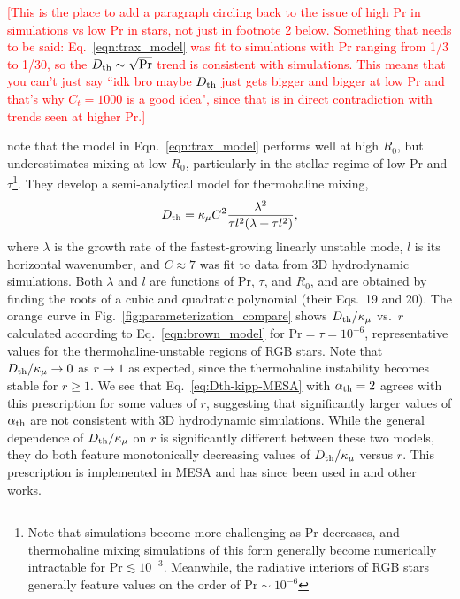 \textcolor{red}{[This is the place to add a paragraph circling back to the issue of high Pr in simulations vs low Pr in stars, not just in footnote 2 below. Something that needs to be said: Eq.~\eqref{eqn:trax_model} was fit to simulations with Pr ranging from 1/3 to 1/30, so the $D_\mathrm{th} \sim \sqrt{\mathrm{Pr}}$ trend is consistent with simulations. This means that you can't just say ``idk bro maybe $D_\mathrm{th}$ just gets bigger and bigger at low Pr and that's why $C_t = 1000$ is a good idea", since that is in direct contradiction with trends seen at higher Pr.]}

\citet{brown_etal_2013} note that the model in Eqn.~\eqref{eqn:trax_model} performs well at high $R_0$, but underestimates mixing at low $R_0$, particularly in the stellar regime of low Pr and $\tau$\footnote{Note that simulations become more challenging as $\mathrm{Pr}$ decreases, and thermohaline mixing simulations of this form generally become numerically intractable for $\mathrm{Pr} \lesssim 10^{-3}$. Meanwhile, the radiative interiors of RGB stars generally feature values on the order of $\mathrm{Pr} \sim 10^{-6}$}.
They develop a semi-analytical model for thermohaline mixing,
\begin{equation}
    \Dth = \kappa_{\mu}C^2\frac{\lambda^2}{\tau l^2(\lambda + \tau l^2)},
    \label{eqn:brown_model}
\end{equation}
where $\lambda$ is the growth rate of the fastest-growing linearly unstable mode, $l$ is its horizontal wavenumber, and $C \approx 7$ was fit to data from 3D hydrodynamic simulations.
Both $\lambda$ and $l$ are functions of $\mathrm{Pr}$, $\tau$, and $R_0$, and are obtained by finding the roots of a cubic and quadratic polynomial (their Eqs.~19 and 20).
The orange curve in Fig.~\ref{fig:parameterization_compare} shows $D_\mathrm{th}/\kappa_\mu$ vs.~$r$ calculated according to Eq.~\eqref{eqn:brown_model} for $\mathrm{Pr} = \tau = 10^{-6}$, representative values for the thermohaline-unstable regions of RGB stars. 
Note that $D_\mathrm{th}/\kappa_\mu \to 0$ as $r \to 1$ as expected, since the thermohaline instability becomes stable for $r \geq 1$.
We see that Eq.~\eqref{eq:Dth-kipp-MESA} with $\alpha_{\rm{th}} = 2$ agrees with this prescription for some values of $r$, suggesting that significantly larger values of $\alpha_{\rm{th}}$ are not consistent with 3D hydrodynamic simulations. 
While the general dependence of $D_\mathrm{th}/\kappa_\mu$ on $r$ is significantly different between these two models, they do both feature monotonically decreasing values of $D_\mathrm{th}/\kappa_\mu$ versus $r$. 
This prescription is implemented in MESA and has since been used in \citep{bauer_bildsten_2019} and other works. %

